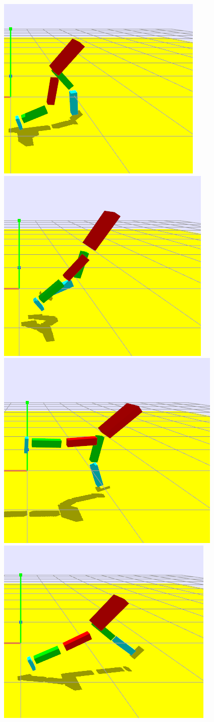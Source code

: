 	\begin{figure}[!htb]
	\centering
	\includegraphics[width=0.45\linewidth]{../images/stepping/step-0.png} 
	\includegraphics[width=0.45\linewidth]{../images/stepping/step-1.png} \\ 
	\includegraphics[width=0.45\linewidth]{../images/stepping/step-2.png}  
	\includegraphics[width=0.45\linewidth]{../images/stepping/step-3.png}  \\

\end{figure}
